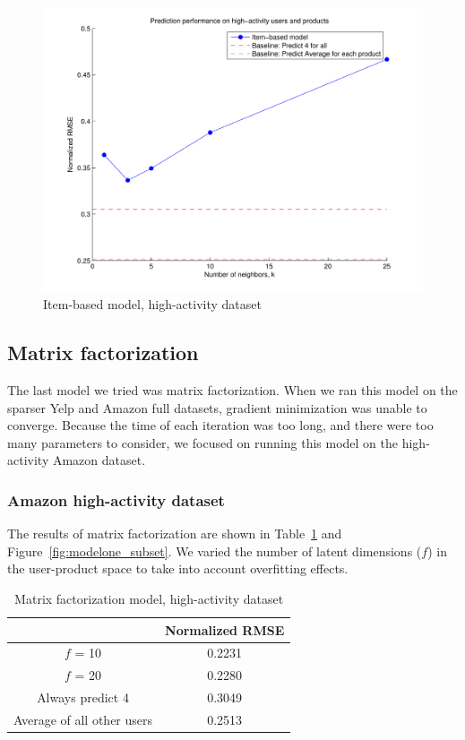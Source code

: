 \documentclass[letterpaper, 11 pt, conference]{ieeeconf}
\begin{document}
\begin{figure}[h]
\includegraphics[scale=0.5]{images/modeltwo_subset.pdf}
\caption{Item-based model, high-activity dataset}
\label{fig:modeltwo_subset}
\end{figure}


\subsection{Matrix factorization}
The last model we tried was matrix factorization. When we ran this model on the 
sparser Yelp and Amazon full datasets, gradient minimization was unable to 
converge. Because the time of each iteration was too long, and there were too 
many parameters to consider, we focused on running this model on the 
high-activity Amazon dataset.

\subsubsection{Amazon high-activity dataset}
The results of matrix factorization are shown in 
Table~\ref{table:modelthree_subset} and
Figure~\ref{fig:modelone_subset}. We varied the number of latent dimensions ($f$)
in the user-product space to take into account overfitting effects. 

\begin{table}[htb]
\centering
\begin{tabular}{|c|c|}
\cline{2-2}

\multicolumn{1}{c|}{} & {Normalized RMSE} \tabularnewline \hline
$f$ = 10 & 0.2231 \tabularnewline
$f$ = 20 & 0.2280 \tabularnewline
\hline
Always predict 4 & 0.3049 \tabularnewline 
Average of all other users & 0.2513 \tabularnewline
\hline
\end{tabular}
\caption{Matrix factorization model, high-activity dataset}
\label{table:modelthree_subset}
\end{table}
\end{document}

